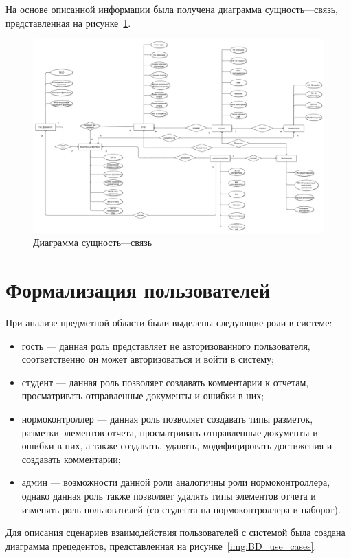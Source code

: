 \newpage
На основе описанной информации была получена диаграмма сущность---связь, представленная на рисунке~\ref{img:ER_RU}.

 \begin{figure}
	\includegraphics[width=\textheight]{./inc/img/ER_RU.pdf}
	\caption{Диаграмма сущность---связь}
	\label{img:ER_RU}
\end{figure}

\section{Формализация пользователей}
При анализе предметной области были выделены следующие роли в системе:
\begin{itemize}
	\item гость --- данная роль представляет не авторизованного пользователя, соответственно он может авторизоваться и войти в систему;
	\item студент --- данная роль позволяет создавать комментарии к отчетам,
	просматривать отправленные документы и ошибки в них;
	\item нормоконтроллер --- данная роль позволяет создавать типы разметок, разметки элементов отчета, просматривать отправленные документы и ошибки в них, а также создавать, удалять, модифицировать достижения и создавать комментарии;
	\item админ --- возможности данной роли аналогичны роли нормоконтроллера, однако данная роль также позволяет удалять типы элементов отчета и изменять роль пользователей (со студента на нормоконтроллера и наборот).
\end{itemize}


Для описания сценариев взаимодействия пользователей с системой была создана диаграмма прецедентов, представленная на рисунке~\ref{img:BD_use_cases}.

